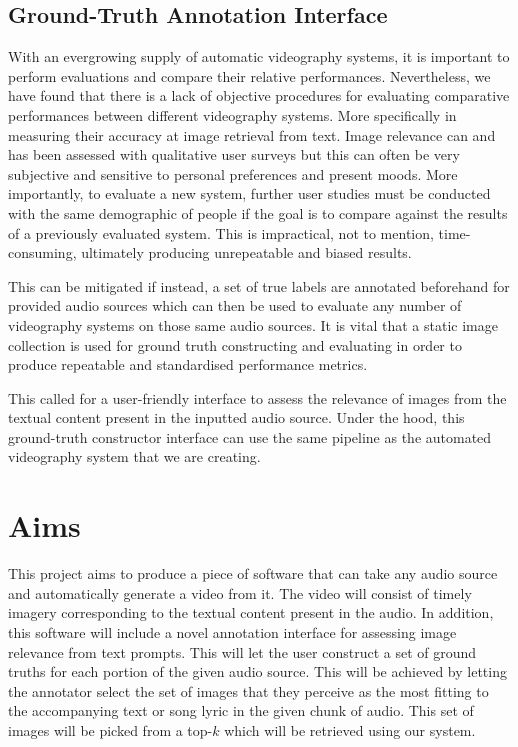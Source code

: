 \documentclass{l4proj}
\begin{document}
\subsection{Ground-Truth Annotation Interface}
With an evergrowing supply of automatic videography systems, it is important to perform evaluations and compare their relative performances. Nevertheless, we have found that there is a lack of objective procedures for evaluating comparative performances between different videography systems. More specifically in measuring their accuracy at image retrieval from text. Image relevance can and has been assessed with qualitative user surveys but this can often be very subjective and sensitive to personal preferences and present moods. More importantly, to evaluate a new system, further user studies must be conducted with the same demographic of people if the goal is to compare against the results of a previously evaluated system. This is impractical, not to mention, time-consuming, ultimately producing unrepeatable and biased results.

This can be mitigated if instead, a set of true labels are annotated beforehand for provided audio sources which can then be used to evaluate any number of videography systems on those same audio sources. It is vital that a static image collection is used for ground truth constructing and evaluating in order to produce repeatable and standardised performance metrics.

This called for a user-friendly interface to assess the relevance of images from the textual content present in the inputted audio source. Under the hood, this ground-truth constructor interface can use the same pipeline as the automated videography system that we are creating. 


\section{Aims}
This project aims to produce a piece of software that can take any audio source and automatically generate a video from it. The video will consist of timely imagery corresponding to the textual content present in the audio. In addition, this software will include a novel annotation interface for assessing image relevance from text prompts. This will let the user construct a set of ground truths for each portion of the given audio source. This will be achieved by letting the annotator select the set of images that they perceive as the most fitting to the accompanying text or song lyric in the given chunk of audio. This set of images will be picked from a top-$k$ which will be retrieved using our system.
\end{document}
